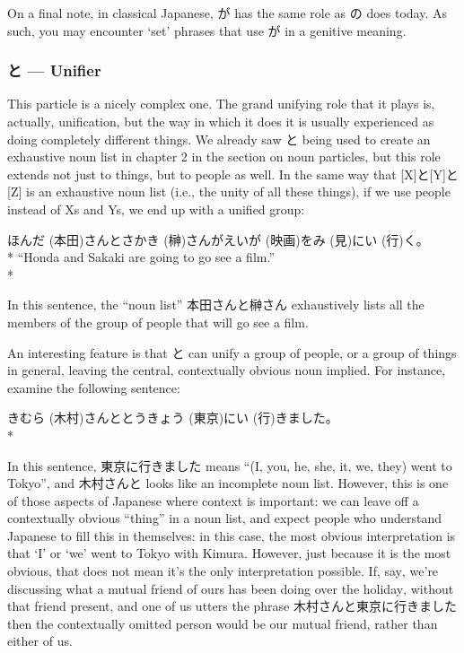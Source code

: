 \documentclass[11pt, b5paper, twoside, openright, onecolumn]{book}
\makeatletter
\newcommand*{\rubystack}[2]{{\relscale{0.5}%
  \begin{tabular}[b]{@{}c@{}}%
    {#1}\\%
   {\textscale{2}{#2}}%
  \end{tabular}}%
}
\DeclareRobustCommand*{\ruby}[2]{%
  \mbox{%
    \setlength{\parskip}{0ex}%
    \BeginAccSupp{method=pdfstringdef,ActualText={#1}}%
      \rubystack{\phantom{#2}}{#1}%
      \llap{%
        \rubystack{#2}{\phantom{#1}}%
      }%
    \EndAccSupp{}%
  }%
}
\renewcommand*{\ruby}[2]{#2 (#1)}%
\newenvironment{exampleblock}{
\setlength{\parindent}{0.6in}
\begin{minipage}[t]{\dimexpr\textwidth-\parindent}}
{\end{minipage}}
\makeatother
\begin{document}
On a final note‚ in classical Japanese‚ が has the same role as の does today. As such‚ you may encounter ‘set’ phrases that use が in a genitive meaning.
\subsubsection{と — Unifier}

This particle is a nicely complex one. The grand unifying role that it plays is‚ actually‚ unification‚ but the way in which it does it is usually experienced as doing completely different things. We already saw と being used to create an exhaustive noun list in chapter 2 in the section on noun particles‚ but this role extends not just to things‚ but to people as well. In the same way that [X]と[Y]と[Z] is an exhaustive noun list (i.e.‚ the unity of all these things)‚ if we use people instead of Xs and Ys‚ we end up with a unified group:

\vspace{0.4cm}
\begin{exampleblock}
\ruby{本田}{ほんだ}さんと\ruby{榊}{さかき}さんが\ruby{映画}{えいが}を\ruby{見}{み}に\ruby{行}{い}く。 \\* 
“Honda and Sakaki are going to go see a film.” \\* 
\end{exampleblock}
\vspace{0.2cm}

In this sentence‚ the “noun list” 本田さんと榊さん exhaustively lists all the members of the group of people that will go see a film.

An interesting feature is that と can unify a group of people‚ or a group of things in general‚ leaving the central‚ contextually obvious noun implied. For instance‚ examine the following sentence:

\vspace{0.4cm}
\begin{exampleblock}
\ruby{木村}{きむら}さんと\ruby{東京}{とうきょう}に\ruby{行}{い}きました。 \\* 
\end{exampleblock}
\vspace{0.2cm}

In this sentence‚ 東京に行きました means “(I‚ you‚ he‚ she‚ it‚ we‚ they) went to Tokyo”‚ and 木村さんと looks like an incomplete noun list. However‚ this is one of those aspects of Japanese where context is important: we can leave off a contextually obvious “thing” in a noun list‚ and expect people who understand Japanese to fill this in themselves: in this case‚ the most obvious interpretation is that ‘I’ or ‘we’ went to Tokyo with Kimura. However‚ just because it is the most obvious‚ that does not mean it’s the only interpretation possible. If‚ say‚ we’re discussing what a mutual friend of ours has been doing over the holiday‚ without that friend present‚ and one of us utters the phrase 木村さんと東京に行きました then the contextually omitted person would be our mutual friend‚ rather than either of us.
\end{document}
